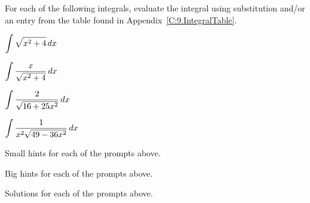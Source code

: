 \begin{activity} \label{A:5.7.1} For each of the following integrals, evaluate the integral using substitution and/or an entry from the table found in Appendix~\ref{C:9.IntegralTable}.
\bmtwo
\ba
	\item $\displaystyle \int \sqrt{x^2 + 4} \, dx$

	\item $\displaystyle \int \frac{x}{\sqrt{x^2 +4}} \, dx$
	
	\item $\displaystyle \int \frac{2}{\sqrt{16+25x^2}}\, dx$
	
	\item $\displaystyle \int \frac{1}{x^2 \sqrt{49-36x^2}} \, dx$
	
\ea
\emtwo
\end{activity}
\begin{smallhint}
\ba
	\item Small hints for each of the prompts above.
\ea
\end{smallhint}
\begin{bighint}
\ba
	\item Big hints for each of the prompts above.
\ea
\end{bighint}
\begin{activitySolution}
\ba
	\item Solutions for each of the prompts above.
\ea
\end{activitySolution}
\aftera